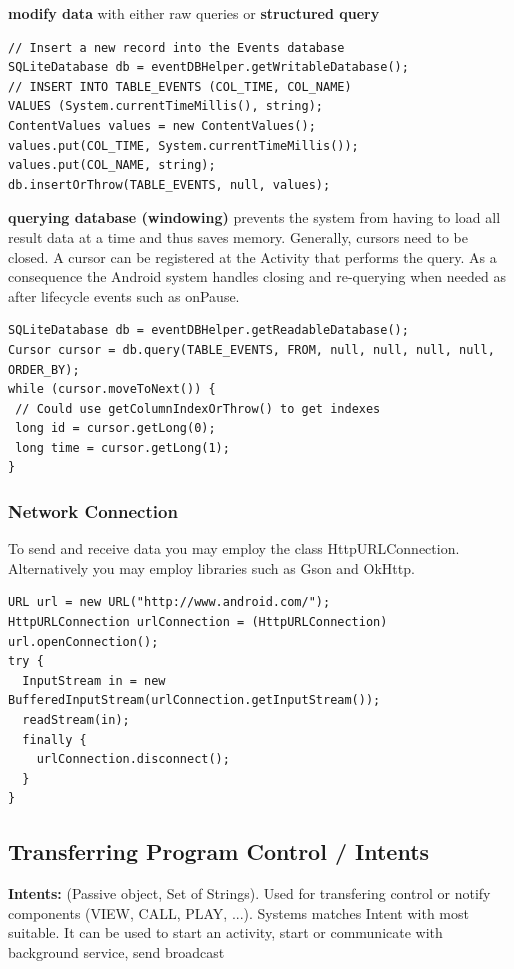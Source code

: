 \textbf{modify data} with either raw queries or \textbf{structured query}
\begin{lstlisting}
// Insert a new record into the Events database
SQLiteDatabase db = eventDBHelper.getWritableDatabase();
// INSERT INTO TABLE_EVENTS (COL_TIME, COL_NAME)
VALUES (System.currentTimeMillis(), string);
ContentValues values = new ContentValues();
values.put(COL_TIME, System.currentTimeMillis());
values.put(COL_NAME, string);
db.insertOrThrow(TABLE_EVENTS, null, values);
\end{lstlisting}

\textbf{querying database (windowing)} prevents the system from having to load
all result data at a time and thus saves memory. Generally, cursors need to be
closed. A cursor can be registered at the Activity that performs the query. As
a consequence the Android system handles closing and re-querying when needed as
after lifecycle events such as onPause.

\begin{lstlisting}
SQLiteDatabase db = eventDBHelper.getReadableDatabase();
Cursor cursor = db.query(TABLE_EVENTS, FROM, null, null, null, null, ORDER_BY);
while (cursor.moveToNext()) {
 // Could use getColumnIndexOrThrow() to get indexes
 long id = cursor.getLong(0);
 long time = cursor.getLong(1);
}
\end{lstlisting}

\subsubsection{Network Connection}
To send and receive data you may employ the class HttpURLConnection.
Alternatively you may employ libraries such as Gson and OkHttp.

\begin{lstlisting}
URL url = new URL("http://www.android.com/");
HttpURLConnection urlConnection = (HttpURLConnection)
url.openConnection();
try {
  InputStream in = new BufferedInputStream(urlConnection.getInputStream());
  readStream(in);
  finally {
    urlConnection.disconnect();
  }
}
\end{lstlisting}

\subsection{Transferring Program Control / Intents}
\textbf{Intents:} (Passive object, Set of Strings). Used for transfering
control or notify components (VIEW, CALL, PLAY, ...). Systems matches Intent
with most suitable. It can be used to start an activity, start or communicate
with background service, send broadcast

